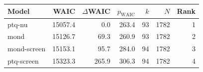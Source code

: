\begin{tabular}{lrrrrrr}
\toprule
Model & WAIC & $\Delta$WAIC & $p_{\mathrm{WAIC}}$ & $k$ & $N$ & Rank \\
\midrule
ptq-nu & 15057.4 & 0.0 & 263.4 & 93 & 1782 & 1 \\
mond & 15126.7 & 69.3 & 260.9 & 93 & 1782 & 2 \\
mond-screen & 15153.1 & 95.7 & 284.0 & 94 & 1782 & 3 \\
ptq-screen & 15323.3 & 265.9 & 306.3 & 94 & 1782 & 4 \\
\bottomrule
\end{tabular}
